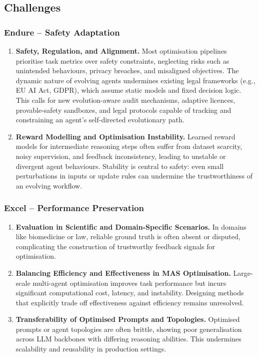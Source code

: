 \documentclass[]{selfevolagent}
\theoremstyle{plain}
\theoremstyle{definition}
\theoremstyle{remark}
\begin{document}
\subsection{Challenges}
\subsubsection{Endure – Safety Adaptation}
\begin{enumerate}[label=(\arabic*)]
    \item \textbf{Safety, Regulation, and Alignment.} Most optimisation pipelines prioritise task metrics over safety constraints, neglecting risks such as unintended behaviours, privacy breaches, and misaligned objectives. The dynamic nature of evolving agents undermines existing legal frameworks (e.g., EU AI Act, GDPR), which assume static models and fixed decision logic. This calls for new evolution-aware audit mechanisms, adaptive licences, provable-safety sandboxes, and legal protocols capable of tracking and constraining an agent’s self-directed evolutionary path.
    \item \textbf{Reward Modelling and Optimisation Instability.} Learned reward models for intermediate reasoning steps often suffer from dataset scarcity, noisy supervision, and feedback inconsistency, leading to unstable or divergent agent behaviours. Stability is central to safety: even small perturbations in inputs or update rules can undermine the trustworthiness of an evolving workflow.
\end{enumerate}

\subsubsection{Excel – Performance Preservation}
\begin{enumerate}[label=(\arabic*)]
    \item \textbf{Evaluation in Scientific and Domain-Specific Scenarios.} In domains like biomedicine or law, reliable ground truth is often absent or disputed, complicating the construction of trustworthy feedback signals for optimisation.
    \item \textbf{Balancing Efficiency and Effectiveness in MAS Optimisation.} Large-scale multi-agent optimisation improves task performance but incurs significant computational cost, latency, and instability. Designing methods that explicitly trade off effectiveness against efficiency remains unresolved.
    \item \textbf{Transferability of Optimised Prompts and Topologies.} Optimised prompts or agent topologies are often brittle, showing poor generalisation across LLM backbones with differing reasoning abilities. This undermines scalability and reusability in production settings.
\end{enumerate}
\end{document}
